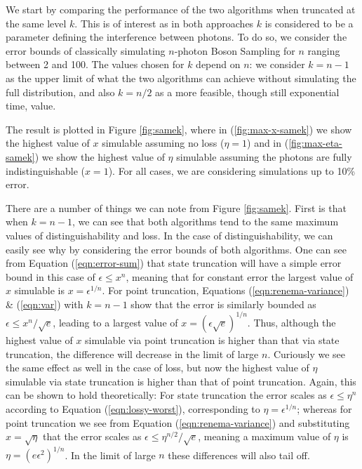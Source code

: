 We start by comparing the performance of the two algorithms when truncated at the same level $k$. 
This is of interest as in both approaches $k$ is considered to be a parameter defining the interference between photons. 
To do so, we consider the error bounds of classically simulating $n$-photon Boson Sampling for $n$ ranging between 2 and 100. 
The values chosen for $k$ depend on $n$: we consider $k=n-1$ as the upper limit of what the two algorithms can achieve without simulating the full distribution, and also $k=n/2$ as a more feasible, though still exponential time, value.

The result is plotted in Figure \ref{fig:samek}, where in (\ref{fig:max-x-samek}) we show the highest value of $x$ simulable assuming no loss ($\eta=1$) and in (\ref{fig:max-eta-samek}) we show the highest value of $\eta$ simulable assuming the photons are fully indistinguishable ($x=1$). 
For all cases, we are considering simulations up to 10\% error.

There are a number of things we can note from Figure \ref{fig:samek}. 
First is that when $k=n-1$, we can see that both algorithms tend to the same maximum values of distinguishability and loss. 
In the case of distinguishability, we can easily see why by considering the error bounds of both algorithms. 
One can see from Equation (\ref{eqn:error-sum}) that state truncation will have a simple error bound in this case of $\epsilon \leq x^n$, meaning that for constant error the largest value of $x$ simulable is $x = \epsilon^{1/n}$. 
For point truncation, Equations (\ref{eqn:renema-variance}) \& (\ref{eqn:var}) with $k=n-1$ show that the error is similarly bounded as $\epsilon \leq x^n/\sqrt{e}$, leading to a largest value of $x=(\epsilon\sqrt{e})^{1/n}$. 
Thus, although the highest value of $x$ simulable via point truncation is higher than that via state truncation, the difference will decrease in the limit of large $n$. 
Curiously we see the same effect as well in the case of loss, but now the highest value of $\eta$ simulable via state truncation is higher than that of point truncation. 
Again, this can be shown to hold theoretically: For state truncation the error scales as $\epsilon \leq \eta^n$ according to Equation (\ref{eqn:lossy-worst}), corresponding to $\eta=\epsilon^{1/n}$; whereas for point truncation we see from Equation (\ref{eqn:renema-variance}) and substituting $x=\sqrt{\eta}$ that the error scales as $\epsilon \leq \eta^{n/2}/\sqrt{e}$, meaning a maximum value of $\eta$ is $\eta=(e\epsilon^2)^{1/n}$. 
In the limit of large $n$ these differences will also tail off.

